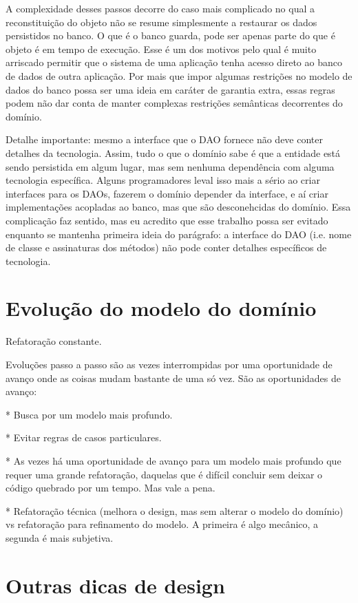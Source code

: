 \documentclass[a4paper, 12pt]{article}
\begin{document}
A complexidade desses passos decorre do caso mais complicado no qual a reconstituição do objeto não se resume simplesmente a restaurar os dados persistidos no banco. O que é o banco guarda, pode ser apenas parte do que é objeto é em tempo de execução. Esse é um dos motivos pelo qual é muito arriscado permitir que o sistema de uma aplicação tenha acesso direto ao banco de dados de outra aplicação. Por mais que impor algumas restrições no modelo de dados do banco possa ser uma ideia em caráter de garantia extra, essas regras podem não dar conta de manter complexas restrições semânticas decorrentes do domínio.

Detalhe importante: mesmo a interface que o DAO fornece não deve conter detalhes da tecnologia. Assim, tudo o que o domínio sabe é que a entidade está sendo persistida em algum lugar, mas sem nenhuma dependência com alguma tecnologia específica. Alguns programadores leval isso mais a sério ao criar interfaces para os DAOs, fazerem o domínio depender da interface, e aí criar implementações acopladas ao banco, mas que são desconehcidas do domínio. Essa complicação faz sentido, mas eu acredito que esse trabalho possa ser evitado enquanto se mantenha primeira ideia do parágrafo: a interface do DAO (i.e. nome de classe e assinaturas dos métodos) não pode conter detalhes específicos de tecnologia.

\section{Evolução do modelo do domínio}

Refatoração constante.

Evoluções passo a passo são as vezes interrompidas por uma oportunidade de avanço onde as coisas mudam bastante de uma só vez. São as oportunidades de avanço: 

* Busca por um modelo mais profundo.

* Evitar regras de casos particulares.

* As vezes há uma oportunidade de avanço para um modelo mais profundo que requer uma grande refatoração, daquelas que é difícil concluir sem deixar o código quebrado por um tempo. Mas vale a pena.

* Refatoração técnica (melhora o design, mas sem alterar o modelo do domínio) vs refatoração para refinamento do modelo. A primeira é algo mecânico, a segunda é mais subjetiva.



\section{Outras dicas de design}
\end{document}
